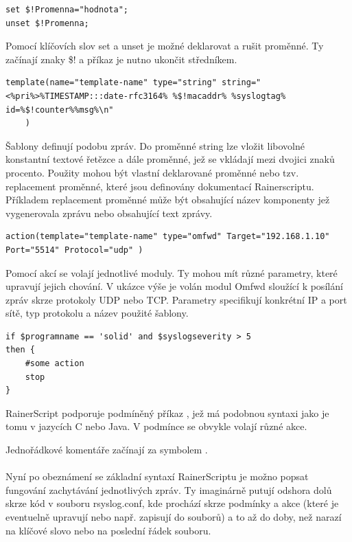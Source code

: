 \documentclass[thesis=B,czech]{FITthesis}[2012/06/26]
\begin{document}
\begin{lstlisting}[style=RainerScriptSimpleStyle]
set $!Promenna="hodnota";
unset $!Promenna;
\end{lstlisting}
Pomocí klíčovích slov set a unset je možné deklarovat a rušit proměnné. Ty začínají znaky \$! a příkaz je nutno ukončit středníkem.

\begin{lstlisting}[style=RainerScriptSimpleStyle]
template(name="template-name" type="string" string="<%pri%>%TIMESTAMP:::date-rfc3164% %$!macaddr% %syslogtag% id=%$!counter%%msg%\n"
	)
\end{lstlisting}
Šablony definují podobu zpráv. Do proměnné string lze vložit libovolné konstantní textové řetězce a dále proměnné, jež se vkládají mezi dvojici znaků procento. Použity mohou být vlastní deklarované proměnné nebo tzv. replacement proměnné, které jsou definovány dokumentací Rainerscriptu. Příkladem replacement proměnné může být  obsahující název komponenty jež vygenerovala zprávu nebo  obsahující text zprávy. 

\begin{lstlisting}[style=RainerScriptSimpleStyle]
action(template="template-name" type="omfwd" Target="192.168.1.10" Port="5514" Protocol="udp" )
\end{lstlisting}

Pomocí akcí se volají jednotlivé moduly. Ty mohou mít různé parametry, které upravují jejich chování. V ukázce výše je volán modul Omfwd sloužící k posílání zpráv skrze protokoly UDP nebo TCP. Parametry specifikují konkrétní IP a port sítě, typ protokolu a název použité šablony.

\begin{lstlisting}[style=RainerScriptSimpleStyle]
if $programname == 'solid' and $syslogseverity > 5
then {
	#some action
	stop
}
\end{lstlisting}
	
RainerScript podporuje podmíněný příkaz , jež má podobnou syntaxi jako je tomu v jazycích C nebo Java.
V podmínce  se obvykle volají různé akce.

Jednořádkové komentáře začínají za symbolem \uv{\#}.
\\
\\
Nyní po obeznámení se základní syntaxí RainerScriptu je možno popsat fungování zachytávání jednotlivých zpráv. Ty imaginárně putují odshora dolů skrze kód v souboru rsyslog.conf, kde prochází skrze podmínky a akce (které je eventuelně upravují nebo např. zapisují do souborů) a to až do doby, než narazí na klíčové slovo  nebo na poslední řádek souboru.
\end{document}
